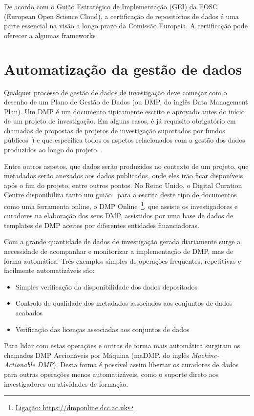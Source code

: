 \documentclass[sigconf,nonacm]{acmart}
\begin{document}
De acordo com o Guião Estratégico de Implementação (GEI) da EOSC (European Open Science Cloud), a certificação de repositórios de dados é uma parte essencial na visão a longo prazo da Comissão Europeia. A certificação pode oferecer a algumas frameworks 

\section{Automatização da gestão de dados}

Qualquer processo de gestão de dados de investigação deve começar com o desenho de um Plano de Gestão de Dados (ou DMP, do inglês Data Management Plan). Um DMP é um documento tipicamente escrito e aprovado antes do início de um projeto de investigação. Em alguns casos, é já requisito obrigatório em chamadas de propostas de projetos de investigação suportados por fundos públicos~\cite{Foundation2011}) e que especifica todos os aspetos relacionados com a gestão dos dados produzidos ao longo do projeto~\cite{}. 

Entre outros aspetos, que dados serão produzidos no contexto de um projeto, que metadados serão anexados aos dados publicados, onde eles irão ficar disponíveis após o fim do projeto, entre outros pontos. No Reino Unido, o Digital Curation Centre disponibiliza tanto um guião~\cite{jones_dmp} para a escrita deste tipo de documentos como uma ferramenta online, o DMP Online~\footnote{\url{Ligação: https://dmponline.dcc.ac.uk}}, que assiste os investigadores e curadores na elaboração dos seus DMP, assistidos por uma base de dados de templates de DMP aceites por diferentes entidades financiadoras.

Com a grande quantidade de dados de investigação gerada diariamente surge a necessidade de acompanhar e monitorizar a implementação de DMP, mas de forma automática. Três exemplos simples de operações frequentes, repetitivas e facilmente automatizáveis são: 

\begin{itemize}
    \item Simples verificação da disponibilidade dos dados depositados
    \item Controlo de qualidade dos metadados associados aos conjuntos de dados acabados
    \item Verificação das licenças associadas aos conjuntos de dados
\end{itemize}

Para lidar com estas operações e outras de forma mais automática surgiram os chamados DMP Accionáveis por Máquina (maDMP, do inglês \textit{Machine-Actionable DMP}). Desta forma é possível assim libertar os curadores de dados para outras operações menos automatizáveis, como o suporte direto aos investigadores ou atividades de formação.
\end{document}
